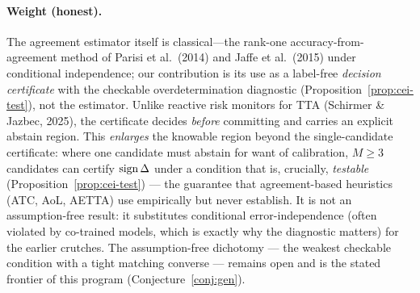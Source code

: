 \paragraph{Weight (honest).} The agreement estimator itself is classical---the rank-one accuracy-from-agreement method of Parisi et al.\ (2014) and Jaffe et al.\ (2015) under conditional independence; our contribution is its use as a label-free \emph{decision certificate} with the checkable overdetermination diagnostic (Proposition~\ref{prop:cei-test}), not the estimator. Unlike reactive risk monitors for TTA (Schirmer \& Jazbec, 2025), the certificate decides \emph{before} committing and carries an explicit abstain region. This \emph{enlarges} the knowable region beyond the
single-candidate certificate: where one candidate must abstain for want of calibration,
$M\ge3$ candidates can certify $\operatorname{sign}\Delta$ under a condition that is, crucially,
\emph{testable} (Proposition~\ref{prop:cei-test}) --- the guarantee that agreement-based
heuristics (ATC, AoL, AETTA) use empirically but never establish. It is not an
assumption-free result: it substitutes conditional error-independence (often violated by
co-trained models, which is exactly why the diagnostic matters) for the earlier crutches.
The assumption-free dichotomy --- the weakest checkable condition with a tight matching
converse --- remains open and is the stated frontier of this program
(Conjecture~\ref{conj:gen}).

